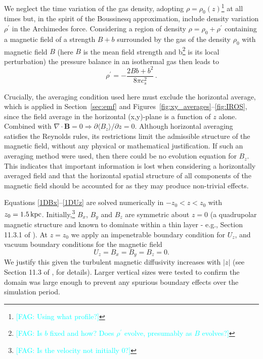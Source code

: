 \documentclass[fleqn,usenatbib]{mnras}
\newcommand{\fag}[1]{\textcolor{cyan}{[FAG: #1]}} %
\newcommand\deriv[2]{\frac{\partial#1}{\partial#2}}%
\newcommand{\kpc}{\,{\rm kpc}}  %
\begin{document}
  We neglect the time variation of the gas density, adopting $\rho =
\rho_0(z)$\footnote{\fag{Using what profile?}} at all times but, in the spirit
of the Boussinesq approximation, include density variation $\rho^\prime$ in the
Archimedes force.  Consider{ing} a region of density $\rho = \rho_0
+\rho^\prime$ containing a magnetic field of a strength $B+b$ surrounded by the
gas of the density $\rho_0$ with magnetic field $B$ (here $B$ is the mean field
strength and b\footnote{\fag{Is $b$ fixed and how? Does $\rho^\prime$ evolve,
presumably as $B$ evolves?}} is its local perturbation) {the} pressure
balance in an isothermal gas then leads to
\begin{equation}
    \rho^\prime = -\dfrac{2Bb+b^2}{8\pi c_s^2}\,.
\end{equation}

Crucially, the averaging condition used here must exclude the horizontal
average, {which is applied in Section~\ref{sec:emf} and
Figures~\ref{fig:xy_averages}--\ref{fig:IROS},} since the field average in the
horizontal (x,y)-plane is a function of $z$ alone. Combined with
$\nabla\cdot\mathbf{B} = 0 \Rightarrow \partial\langle B_z\rangle/\partial
z=0$.  Although horizontal averaging satisfies the Reynolds rules, its
restrictions limit the admissible structure of the magnetic field, without any
physical or mathematical justification.  If such an averaging method were used,
then there could be no evolution equation for $B_z$.  This indicates that
important information is lost when considering a horizontally averaged field
and that the horizontal spatial structure of all components of the magnetic
field should be accounted for as they may produce non-trivial effects.

Equations \eqref{1DBx}{--}\eqref{1DUz} are solved numerically in
$-z_0<z<z_0$ with $z_0=1.5\kpc$. Initially,\footnote{\fag{Is the velocity not
initially 0?}} $B_x$, $B_y$ and $B_z$ are symmetric about $z=0$ (a quadrupolar
magnetic structure and known to dominate within a thin layer - e.g., Section
11.3.1 of \citealt{SS21}).
At $z=z_0$ we apply an impenetrable boundary condition for $U_z$, and vacuum boundary conditions for the magnetic field
\begin{equation}
    U_z = B_x = B_y = B_z = 0{.}
\end{equation}
We justify this {given} the turbulent magnetic diffusivity increases with
$\lvert z \rvert$ (see Section 11.3 of \citealt{SS21}, for details). Larger
vertical sizes were {tested} to confirm the domain was large enough to
prevent any spurious boundary effects over the simulation period.
\end{document}
